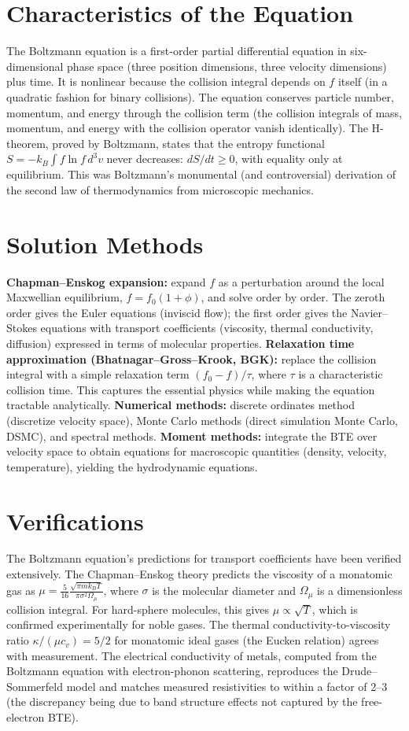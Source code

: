 \documentclass[11pt,openright]{book}
\begin{document}
\section*{Characteristics of the Equation}

The Boltzmann equation is a first-order partial differential equation in six-dimensional phase space (three position dimensions, three velocity dimensions) plus time. It is nonlinear because the collision integral depends on $f$ itself (in a quadratic fashion for binary collisions). The equation conserves particle number, momentum, and energy through the collision term (the collision integrals of mass, momentum, and energy with the collision operator vanish identically). The H-theorem, proved by Boltzmann, states that the entropy functional $S = -k_B\int f\ln f\,d^3v$ never decreases: $dS/dt \geq 0$, with equality only at equilibrium. This was Boltzmann's monumental (and controversial) derivation of the second law of thermodynamics from microscopic mechanics.
\section*{Solution Methods}

\textbf{Chapman--Enskog expansion:} expand $f$ as a perturbation around the local Maxwellian equilibrium, $f = f_0(1 + \phi)$, and solve order by order. The zeroth order gives the Euler equations (inviscid flow); the first order gives the Navier--Stokes equations with transport coefficients (viscosity, thermal conductivity, diffusion) expressed in terms of molecular properties. \textbf{Relaxation time approximation (Bhatnagar--Gross--Krook, BGK):} replace the collision integral with a simple relaxation term $(f_0 - f)/\tau$, where $\tau$ is a characteristic collision time. This captures the essential physics while making the equation tractable analytically. \textbf{Numerical methods:} discrete ordinates method (discretize velocity space), Monte Carlo methods (direct simulation Monte Carlo, DSMC), and spectral methods. \textbf{Moment methods:} integrate the BTE over velocity space to obtain equations for macroscopic quantities (density, velocity, temperature), yielding the hydrodynamic equations.
\section*{Verifications}

The Boltzmann equation's predictions for transport coefficients have been verified extensively. The Chapman--Enskog theory predicts the viscosity of a monatomic gas as $\mu = \frac{5}{16}\frac{\sqrt{\pi mk_BT}}{\pi\sigma^2\Omega_\mu}$, where $\sigma$ is the molecular diameter and $\Omega_\mu$ is a dimensionless collision integral. For hard-sphere molecules, this gives $\mu \propto \sqrt{T}$, which is confirmed experimentally for noble gases. The thermal conductivity-to-viscosity ratio $\kappa/(\mu c_v) = 5/2$ for monatomic ideal gases (the Eucken relation) agrees with measurement. The electrical conductivity of metals, computed from the Boltzmann equation with electron-phonon scattering, reproduces the Drude--Sommerfeld model and matches measured resistivities to within a factor of 2--3 (the discrepancy being due to band structure effects not captured by the free-electron BTE).
\end{document}
